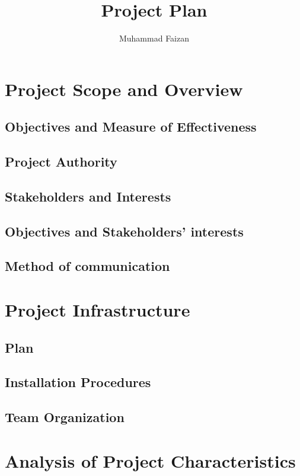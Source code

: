 \documentclass{article}
\title{Project Plan}
\author{Muhammad Faizan}
\begin{document}
	\maketitle
	\newpage
	
	\tableofcontents
	\newpage
	
	\section{Project Scope and Overview}
		\subsection{Objectives and Measure of Effectiveness}
			
		\subsection{Project Authority}
		\subsection{Stakeholders and Interests}
		\subsection{Objectives and Stakeholders' interests}
		\subsection{Method of communication}
	
	
	\section{Project Infrastructure}
		\subsection{Plan}
		\subsection{Installation Procedures}
		\subsection{Team Organization}
		
	\section{Analysis of Project Characteristics}
\end{document}
